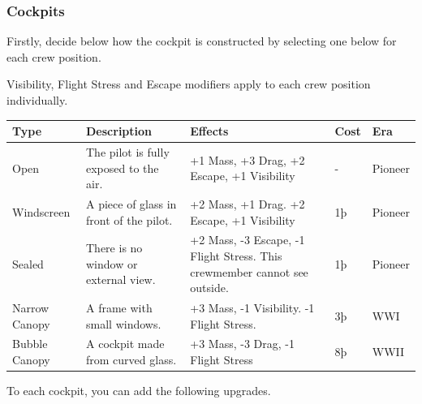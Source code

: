 \documentclass{article}
\begin{document}
\subsubsection{Cockpits}
\label{_Cockpits}

Firstly, decide below how the cockpit is constructed by selecting one
below for each crew position.

Visibility, Flight Stress and Escape modifiers apply to each crew
position individually.

\begin{tabular}{|l|l|l|l|l|}
    \hline
    Type                                               & Description                             & Effects                    & Cost & Era \\\hline
    Open                                               & The pilot is fully exposed to the air.  & +1 Mass, +3 Drag, +2
    Escape, +1 Visibility                              & -                                       & Pioneer                                 \\\hline
    Windscreen                                         & A piece of glass in front of the pilot. & +2 Mass, +1 Drag.
    +2 Escape, +1 Visibility                           & 1þ                                      & Pioneer                                 \\\hline
    Sealed                                             & There is no window or external view.    & +2 Mass, -3 Escape, -1
    Flight Stress. This crewmember cannot see outside. & 1þ                                      & Pioneer                                 \\\hline
    Narrow Canopy                                      & A frame with small windows.             & +3 Mass, -1 Visibility. -1
    Flight Stress.                                     & 3þ                                      & WWI                                     \\\hline
    Bubble Canopy                                      & A cockpit made from curved glass.       & +3 Mass, -3 Drag, -1
    Flight Stress                                      & 8þ                                      & WWII                                    \\\hline
\end{tabular}

To each cockpit, you can add the following upgrades.
\end{document}
